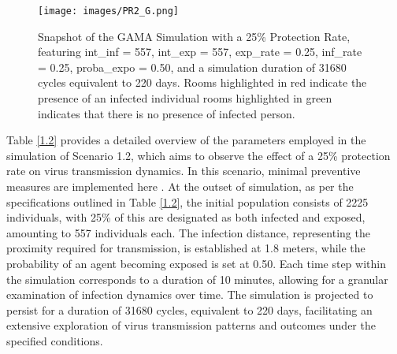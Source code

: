 	\begin{figure}[H]
	\centering
	\texttt{[image: images/PR2\_G.png]}
	\caption{Snapshot of the GAMA Simulation with a 25\% Protection Rate, featuring int\_inf = 557, int\_exp = 557, exp\_rate = 0.25, inf\_rate = 0.25, proba\_expo = 0.50, and a simulation duration of 31680 cycles equivalent to 220 days. Rooms highlighted in red indicate the presence of an infected individual rooms highlighted in green indicates that there is no presence of infected person.}
	\label{PR2G}
	\end{figure}
Table \ref{1.2} provides a detailed overview of the parameters employed in the simulation of Scenario 1.2, which aims to observe the effect of a 25\% protection rate on virus transmission dynamics. In this scenario, minimal preventive measures are implemented here . At the outset of simulation, as per the specifications outlined in Table \ref{1.2}, the initial population consists of 2225 individuals, with 25\% of this are designated as both infected and exposed, amounting to 557 individuals each. The infection distance, representing the proximity required for transmission, is established at 1.8 meters, while the probability of an agent becoming exposed is set at 0.50. Each time step within the simulation corresponds to a duration of 10 minutes, allowing for a granular examination of infection dynamics over time. The simulation is projected to persist for a duration of 31680 cycles, equivalent to 220 days, facilitating an extensive exploration of virus transmission patterns and outcomes under the specified conditions. 


